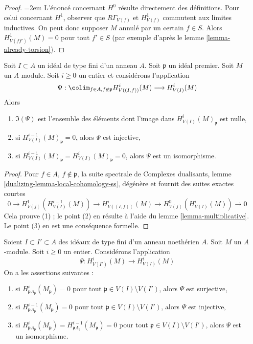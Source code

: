 \begin{proof}
{\emergencystretch=2em
L'énoncé concernant $H^0$ résulte directement des définitions. Pour celui concernant $H^1$, observer que $R\Gamma_{V(f)}$ et $H^1_{V(f)}$ commutent aux limites inductives. On peut donc supposer $M$ annulé par un certain $f \in S$. Alors $H^1_{V(ff')}(M) = 0$ pour tout $f' \in S$ (par exemple d'après le lemme \ref{lemma-already-torsion}).
\par}
\end{proof}

\begin{lemma}
\label{lemma-elements-come-from-bigger}
Soit $I \subset A$ un idéal de type fini d'un anneau $A$. Soit $\mathfrak p$ un idéal premier. Soit $M$ un $A$-module. Soit $i \geq 0$ un entier et considérons l'application
$$
\Psi :
\colim_{f \in A, f \not \in \mathfrak p} H^i_{V((I, f))}(M)
\longrightarrow
H^i_{V(I)}(M)
$$
Alors
\begin{enumerate}
\item $\Im(\Psi)$ est l'ensemble des éléments dont l'image dans $H^i_{V(I)}(M)_\mathfrak p$ est nulle,
\item si $H^{i - 1}_{V(I)}(M)_\mathfrak p = 0$, alors $\Psi$ est injective,
\item si $H^{i - 1}_{V(I)}(M)_\mathfrak p = H^i_{V(I)}(M)_\mathfrak p = 0$, alors $\Psi$ est un isomorphisme.
\end{enumerate}
\end{lemma}

\begin{proof}
Pour $f \in A$, $f \not \in \mathfrak p$, la suite spectrale de Complexes dualisants, lemme \ref{dualizing-lemma-local-cohomology-ss}, dégénère et fournit des suites exactes courtes
$$
0 \to H^1_{V(f)}(H^{i - 1}_{V(I)}(M)) \to
H^i_{V((I, f))}(M) \to H^0_{V(f)}(H^i_{V(I)}(M)) \to 0
$$
Cela prouve (1) ; le point (2) en résulte à l'aide du lemme \ref{lemma-multiplicative}. Le point (3) en est une conséquence formelle.
\end{proof}

\begin{lemma}
\label{lemma-isomorphism}
Soient $I \subset I' \subset A$ des idéaux de type fini d'un anneau noethérien $A$. Soit $M$ un $A$-module. Soit $i \geq 0$ un entier. Considérons l'application
$$
\Psi : H^i_{V(I')}(M) \to H^i_{V(I)}(M)
$$
On a les assertions suivantes :
\begin{enumerate}
\item si $H^i_{\mathfrak pA_\mathfrak p}(M_\mathfrak p) = 0$ pour tout $\mathfrak p \in V(I) \setminus V(I')$, alors $\Psi$ est surjective,
\item si $H^{i - 1}_{\mathfrak pA_\mathfrak p}(M_\mathfrak p) = 0$ pour tout $\mathfrak p \in V(I) \setminus V(I')$, alors $\Psi$ est injective,
\item si $H^i_{\mathfrak pA_\mathfrak p}(M_\mathfrak p) =
H^{i - 1}_{\mathfrak pA_\mathfrak p}(M_\mathfrak p) = 0$ pour tout $\mathfrak p \in V(I) \setminus V(I')$, alors $\Psi$ est un isomorphisme.
\end{enumerate}
\end{lemma}

